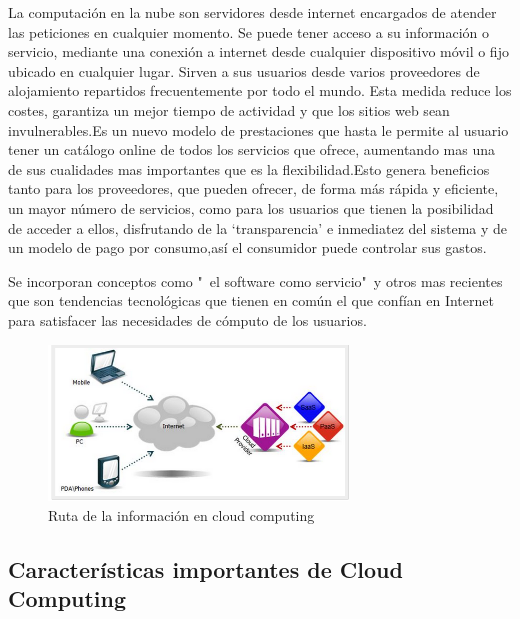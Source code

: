 \documentclass[12pt,a4paper]{article}
\begin{document}
La computación en la nube son servidores desde internet
encargados de atender las peticiones en cualquier momento. Se
puede tener acceso a su información o servicio, mediante una
conexión a internet desde cualquier dispositivo móvil o fijo
ubicado en cualquier lugar. Sirven a sus usuarios desde varios
proveedores de alojamiento repartidos frecuentemente por todo el
mundo. Esta medida reduce los costes, garantiza un mejor tiempo
de actividad y que los sitios web sean invulnerables.Es un nuevo
modelo de prestaciones que hasta le permite al usuario tener un
catálogo online de todos los servicios que ofrece, aumentando
mas una de sus cualidades mas importantes que es la
flexibilidad.Esto genera beneficios tanto para los proveedores,
que pueden ofrecer, de forma más rápida y eficiente, un mayor
número de servicios, como para los usuarios que tienen la
posibilidad de acceder a ellos, disfrutando de la
‘transparencia’ e inmediatez del sistema y de un modelo de pago
por consumo,así el consumidor puede controlar sus gastos.\par Se
incorporan conceptos como "\ el software como servicio"\ y otros
mas recientes que son tendencias tecnológicas que tienen en
común el que confían en Internet para satisfacer las necesidades
de cómputo de los usuarios.


\begin{figure}[h!]
 \centering
 \includegraphics[width=0.71\textwidth]{cc_def.png}
\caption[Ruta de datos]{Ruta de la información en cloud
computing}
\end{figure}

\par
\subsection{Características importantes de Cloud Computing}
\end{document}
